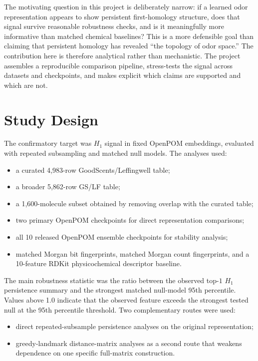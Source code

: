 \documentclass[11pt]{article}
\begin{document}
The motivating question in this project is deliberately narrow: if a learned odor representation appears to show persistent first-homology structure, does that signal survive reasonable robustness checks, and is it meaningfully more informative than matched chemical baselines? This is a more defensible goal than claiming that persistent homology has revealed ``the topology of odor space.'' The contribution here is therefore analytical rather than mechanistic. The project assembles a reproducible comparison pipeline, stress-tests the signal across datasets and checkpoints, and makes explicit which claims are supported and which are not.

\section{Study Design}

The confirmatory target was $H_1$ signal in fixed OpenPOM embeddings, evaluated with repeated subsampling and matched null models. The analyses used:

\begin{itemize}
  \item a curated 4,983-row GoodScents/Leffingwell table;
  \item a broader 5,862-row GS/LF table;
  \item a 1,600-molecule subset obtained by removing overlap with the curated table;
  \item two primary OpenPOM checkpoints for direct representation comparisons;
  \item all 10 released OpenPOM ensemble checkpoints for stability analysis;
  \item matched Morgan bit fingerprints, matched Morgan count fingerprints, and a 10-feature RDKit physicochemical descriptor baseline.
\end{itemize}

The main robustness statistic was the ratio between the observed top-$1$ $H_1$ persistence summary and the strongest matched null-model 95th percentile. Values above 1.0 indicate that the observed feature exceeds the strongest tested null at the 95th percentile threshold. Two complementary routes were used:

\begin{itemize}
  \item direct repeated-subsample persistence analyses on the original representation;
  \item greedy-landmark distance-matrix analyses as a second route that weakens dependence on one specific full-matrix construction.
\end{itemize}
\end{document}
